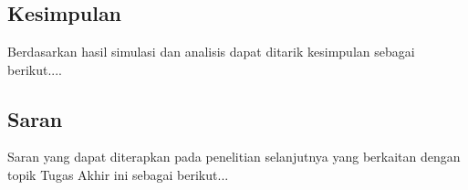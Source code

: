 \chapter{\babLima}



\section{Kesimpulan}
Berdasarkan hasil simulasi dan analisis dapat ditarik kesimpulan sebagai berikut....

\section{Saran}
Saran yang dapat diterapkan pada penelitian selanjutnya yang berkaitan dengan topik Tugas Akhir ini sebagai berikut...